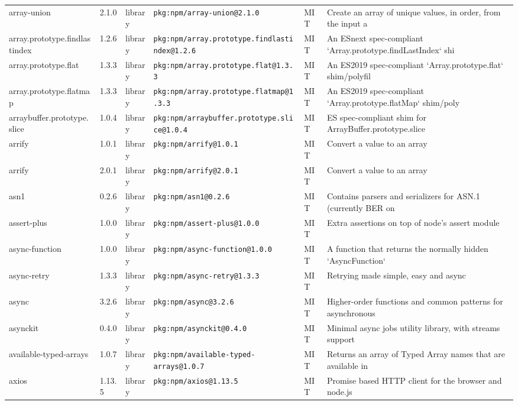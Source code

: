 \documentclass[11pt]{article}
\begin{document}
\begin{longtable}{|l|l|l|p{2.2cm}|l|p{4cm}|}
array-union & 2.1.0 & library & \texttt{pkg:npm/array-union@2.1.0} & MIT & Create an array of unique values, in order, from the input a \\
array.prototype.findlastindex & 1.2.6 & library & \texttt{pkg:npm/array.prototype.findlastindex@1.2.6} & MIT & An ESnext spec-compliant `Array.prototype.findLastIndex` shi \\
array.prototype.flat & 1.3.3 & library & \texttt{pkg:npm/array.prototype.flat@1.3.3} & MIT & An ES2019 spec-compliant `Array.prototype.flat` shim/polyfil \\
array.prototype.flatmap & 1.3.3 & library & \texttt{pkg:npm/array.prototype.flatmap@1.3.3} & MIT & An ES2019 spec-compliant `Array.prototype.flatMap` shim/poly \\
arraybuffer.prototype.slice & 1.0.4 & library & \texttt{pkg:npm/arraybuffer.prototype.slice@1.0.4} & MIT & ES spec-compliant shim for ArrayBuffer.prototype.slice \\
arrify & 1.0.1 & library & \texttt{pkg:npm/arrify@1.0.1} & MIT & Convert a value to an array \\
arrify & 2.0.1 & library & \texttt{pkg:npm/arrify@2.0.1} & MIT & Convert a value to an array \\
asn1 & 0.2.6 & library & \texttt{pkg:npm/asn1@0.2.6} & MIT & Contains parsers and serializers for ASN.1 (currently BER on \\
assert-plus & 1.0.0 & library & \texttt{pkg:npm/assert-plus@1.0.0} & MIT & Extra assertions on top of node's assert module \\
async-function & 1.0.0 & library & \texttt{pkg:npm/async-function@1.0.0} & MIT & A function that returns the normally hidden `AsyncFunction`  \\
async-retry & 1.3.3 & library & \texttt{pkg:npm/async-retry@1.3.3} & MIT & Retrying made simple, easy and async \\
async & 3.2.6 & library & \texttt{pkg:npm/async@3.2.6} & MIT & Higher-order functions and common patterns for asynchronous  \\
asynckit & 0.4.0 & library & \texttt{pkg:npm/asynckit@0.4.0} & MIT & Minimal async jobs utility library, with streams support \\
available-typed-arrays & 1.0.7 & library & \texttt{pkg:npm/available-typed-arrays@1.0.7} & MIT & Returns an array of Typed Array names that are available in  \\
axios & 1.13.5 & library & \texttt{pkg:npm/axios@1.13.5} & MIT & Promise based HTTP client for the browser and node.js \\

\end{longtable}
\end{document}
